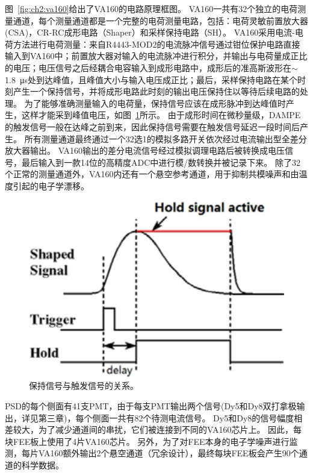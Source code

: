 图~\ref{fig:ch2:va160}给出了VA160的电路原理框图。
VA160一共有32个独立的电荷测量通道，每个测量通道都是一个完整的电荷测量电路，包括：电荷灵敏前置放大器(CSA)，CR-RC成形电路（Shaper）和采样保持电路（SH）。
VA160采用电流-电荷方法进行电荷测量：来自R4443-MOD2的电流脉冲信号通过钳位保护电路直接输入到VA160中；前置放大器对输入的电流脉冲进行积分，并输出与电荷量成正比的电压；电压信号之后经耦合电容输入到成形电路中，成形后的准高斯波形在$\sim$\SI{1.8}{\micro\second}处到达峰值，且峰值大小与输入电压成正比；最后，采样保持电路在某个时刻产生一个保持信号，并将成形电路此时刻的输出电压保持住以等待后续电路的处理。
为了能够准确测量输入的电荷量，保持信号应该在成形脉冲到达峰值时产生，这样才能采到峰值电压，如图~\ref{fig:ch2:sample_hold}所示。
由于成形时间在微秒量级，DAMPE的触发信号一般在达峰之前到来，因此保持信号需要在触发信号延迟一段时间后产生。
所有测量通道最终通过一个32选1的模拟多路开关依次经过电流输出型全差分放大器输出。
VA160输出的差分电流信号经过模拟调理电路后被转换成电压信号，最后输入到一款14位的高精度ADC中进行模/数转换并被记录下来。
除了32个正常的测量通道外，VA160内还有一个悬空参考通道，用于抑制共模噪声和由温度引起的电子学漂移。

\begin{figure}[h!]	
	\centering
	\includegraphics[width=0.5\linewidth]{chap/description/fig/sample_hold}
	\caption{保持信号与触发信号的关系。}
	\label{fig:ch2:sample_hold}
\end{figure}

PSD的每个侧面有41支PMT，由于每支PMT输出两个信号(Dy5和Dy8双打拿极输出，详见第三章)，每个侧面一共有82个待测电流信号。
Dy5和Dy8的信号幅度相差较大，为了减少通道间的串扰，它们被连接到不同的VA160芯片上。
因此，每块FEE板上使用了4片VA160芯片。
另外，为了对FEE本身的电子学噪声进行监测，每片VA160额外输出2个悬空通道（冗余设计），最终每块FEE板会产生90个通道的科学数据。

